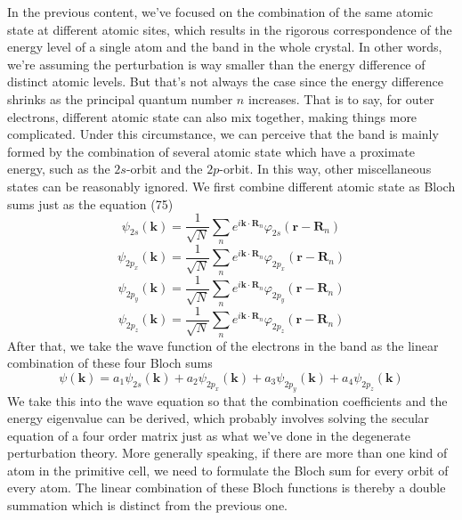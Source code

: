 \documentclass{article}
\begin{document}
In the previous content, we've focused on the combination of the same atomic state at different atomic sites, which results in the rigorous correspondence of the energy level of a single atom and the band in the whole crystal. In other words, we're assuming the perturbation is way smaller than the energy difference of distinct atomic levels. But that's not always the case since the energy difference shrinks as the principal quantum number $n$ increases. That is to say, for outer electrons, different atomic state can also mix together, making things more complicated. Under this circumstance, we can perceive that the band is mainly formed by the combination of several atomic state which have a proximate energy, such as the $2s$-orbit and the $2p$-orbit. In this way, other miscellaneous states can be reasonably ignored. We first combine different atomic state as Bloch sums just as the equation (75)\begin{equation}
    \psi_{2s}(\mathbf{k})=\frac{1}{\sqrt{N}}\sum_ne^{i\mathbf{k}\cdot\mathbf{R}_n}\varphi_{2s}(\mathbf{r}-\mathbf{R}_n)
\end{equation}\begin{equation}
    \psi_{2p_x}(\mathbf{k})=\frac{1}{\sqrt{N}}\sum_ne^{i\mathbf{k}\cdot\mathbf{R}_n}\varphi_{2p_x}(\mathbf{r}-\mathbf{R}_n)
\end{equation}\begin{equation}
    \psi_{2p_y}(\mathbf{k})=\frac{1}{\sqrt{N}}\sum_ne^{i\mathbf{k}\cdot\mathbf{R}_n}\varphi_{2p_y}(\mathbf{r}-\mathbf{R}_n)
\end{equation}\begin{equation}
    \psi_{2p_z}(\mathbf{k})=\frac{1}{\sqrt{N}}\sum_ne^{i\mathbf{k}\cdot\mathbf{R}_n}\varphi_{2p_z}(\mathbf{r}-\mathbf{R}_n)
\end{equation}
After that, we take the wave function of the electrons in the band as the linear combination of these four Bloch sums\begin{equation}
    \psi(\mathbf{k})=a_1\psi_{2s}(\mathbf{k})+a_2\psi_{2p_x}(\mathbf{k})+a_3\psi_{2p_y}(\mathbf{k})+a_4\psi_{2p_z}(\mathbf{k})
\end{equation}
We take this into the wave equation so that the combination coefficients and the energy eigenvalue can be derived, which probably involves solving the secular equation of a four order matrix just as what we've done in the degenerate perturbation theory. More generally speaking, if there are more than one kind of atom in the primitive cell, we need to formulate the Bloch sum for every orbit of every atom. The linear combination of these Bloch functions is thereby a double summation which is distinct from the previous one.\\
\end{document}
